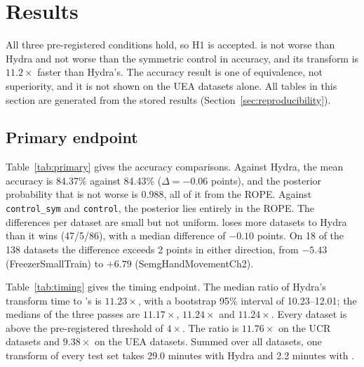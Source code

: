 \section{Results}
\label{sec:results}

All three pre-registered conditions hold, so H1 is accepted. \hh{} is not worse than Hydra
and not worse than the symmetric control in accuracy, and its transform is $11.2\times$
faster than Hydra's. The accuracy result is one of equivalence, not superiority, and it is
not shown on the UEA datasets alone. All tables in this section are generated from the
stored results (Section~\ref{sec:reproducibility}).

\subsection{Primary endpoint}

\begin{table}[t]
\centering\small

\caption{Primary endpoint: \hh{} against each arm over 138 datasets (dataset means over 30
resamples, percentage points). $\Delta$ is \hh{} minus the comparator; W/T/L counts
datasets. Bayesian signed-rank test with ROPE $\pm0.5$; bold: $P(\text{not worse})\ge
0.95$.}
\label{tab:primary}
\end{table}

\begin{table}[t]
\centering\small

\caption{Single-core transform time (Apple M4, one thread). Per dataset, the median of
three pass medians; the table gives the median over datasets of the per-dataset ratios.}
\label{tab:timing}
\end{table}

Table~\ref{tab:primary} gives the accuracy comparisons. Against Hydra, the mean accuracy is
84.37\% against 84.43\% ($\Delta=-0.06$ points), and the posterior probability that \hh{}
is not worse is 0.988, all of it from the ROPE. Against \texttt{control\_sym} and
\texttt{control}, the posterior lies entirely in the ROPE. The differences per dataset are
small but not uniform. \hh{} loses more datasets to Hydra than it wins (47/5/86), with a
median difference of $-0.10$ points. On 18 of the 138 datasets the difference exceeds 2
points in either direction, from $-5.43$ (FreezerSmallTrain) to $+6.79$
(SemgHandMovementCh2).

Table~\ref{tab:timing} gives the timing endpoint. The median ratio of Hydra's transform time
to \hh{}'s is $11.23\times$, with a bootstrap 95\% interval of 10.23--12.01; the medians
of the three passes are $11.17\times$, $11.24\times$ and $11.24\times$. Every dataset is
above the pre-registered threshold of $4\times$. The ratio is $11.76\times$ on the UCR
datasets and $9.38\times$ on the UEA datasets. Summed over all datasets, one transform of
every test set takes 29.0 minutes with Hydra and 2.2 minutes with \hh{}.


